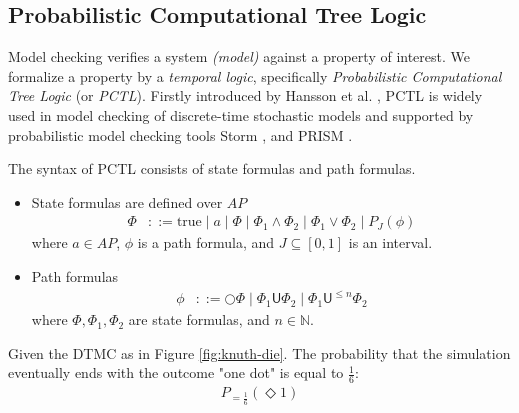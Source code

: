 \subsection{Probabilistic Computational Tree Logic}
Model checking verifies a system \textit{(model)} against a property of interest. We
formalize a property by a \textit{temporal logic}, specifically \textit{Probabilistic Computational
      Tree Logic} (or \textit{PCTL}). Firstly introduced by Hansson et al. \cite{hansson1994logic}, PCTL
is widely used in model checking of discrete-time stochastic models and supported by
probabilistic model checking tools Storm \cite{dehnert2017storm}, and PRISM \cite{kwiatkowska2011prism}.
\begin{definition}
      \rm
      The syntax of PCTL consists of state formulas and path formulas.
      \begin{itemize}
            \item State formulas are defined over $AP$
                  \begin{align*}
                        \Phi & ::= \text{true} \;|\; a \;|\; \Phi \;|\; \Phi_1 \wedge \Phi_2 \;|\; \Phi_1 \vee \Phi_2 \;|\;  P_{J}(\phi)
                  \end{align*}
                  where $a\in AP$, $\phi$ is a path formula, and $J\subseteq[0,1]$ is an interval.
            \item Path formulas
                  \begin{align*}
                        \phi & ::= \bigcirc \Phi \;|\; \Phi_1 \mathsf{U} \Phi_2 \;|\; \Phi_1 \mathsf{U}^{\leq n} \Phi_2
                  \end{align*}
                  where $\Phi,\Phi_1,\Phi_2$ are state formulas, and $n\in \mathbb{N}$.
      \end{itemize}
\end{definition}

\begin{example}
      Given the DTMC as in Figure \ref{fig:knuth-die}. The probability that the simulation eventually ends with the outcome "one dot" is equal to $\frac{1}{6}$:
      \begin{align*}
            P_{=\frac{1}{6}}(\Diamond 1)
      \end{align*}
\end{example}

